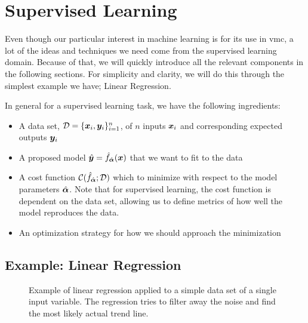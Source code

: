 \documentclass[Thesis.tex]{subfiles}
\begin{document}
\section{Supervised Learning}

Even though our particular interest in machine learning is for its use in \gls{vmc}, a
lot of the ideas and techniques we need come from the supervised learning
domain. Because of that, we will quickly introduce all the relevant components in the
following sections. For simplicity and clarity, we will do this through the
simplest example we have; Linear Regression.

In general for a supervised learning task, we have the following ingredients:

\begin{itemize}
\item A data set, $\mathcal{D} = \{\bm{x}_i, \bm{y}_i\}_{i=1}^n$, of $n$ inputs $\bm{x}_i$
  and corresponding expected outputs $\bm{y}_i$
\item A proposed model $\hat{\bm{y}} = \hat f_{\hat{\bm{\alpha}}}(\bm{x})$ that we want to
    fit to the data
\item A cost function $\mathcal{C}(\hat f_{\hat{\bm{\alpha}}}; \mathcal{D})$ which
  to minimize with respect to the model parameters $\hat {\bm{\alpha}}$. Note that for
  supervised learning, the cost function is dependent on the data set, allowing
  us to define metrics of how well the model reproduces the data.
\item An optimization strategy for how we should approach the minimization
\end{itemize}


\subsection{Example: Linear Regression}

\begin{figure}[h]
  \centering
  \resizebox{0.7\linewidth}{!}{%
      
  }
  \caption[Example of linear regression]{Example of linear regression applied to a simple data set of a single
    input variable. The regression tries to filter away the noise and find the
    most likely actual trend line.}
  \label{fig:linear-regression-example}
\end{figure}
\end{document}
